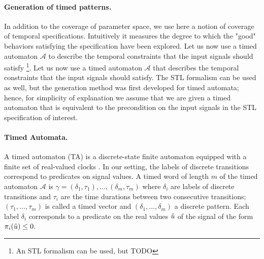 \paragraph{Generation of timed patterns.} 
In addition to the coverage of parameter space, we use here a notion of coverage of temporal specifications. Intuitively it measures the degree to which the "good" behaviors satisfying the specification have been explored. Let us now use a timed automaton $\mathcal{A}$ to describe the temporal constraints that the input signals should satisfy \footnote{An STL formalism can be used, but {\color{red}TODO}}.  Let us now use a timed automaton $\mathcal{A}$ that describes the temporal constraints that the input signals should satisfy. The STL formalism can be used as well, but the generation method  was first developed for timed automata; hence, for simplicity of explanation we assume that we are given a timed automaton that is equivalent to the precondition on the input signals in the STL specification of interest. 

\paragraph{Timed Automata.} 
A timed automaton (TA) is a discrete-state finite automaton equipped with a finite set of real-valued clocks \cite{Alur94}.
In our setting, the labels of discrete transitions correspond to predicates on signal values.
A timed word of length $m$ of the timed automaton $\mathcal{A}$ is $\gamma = (\delta_1, \tau_1), \ldots, (\delta_m, \tau_m)$ where $\delta_i$ are labels of discrete transitions and $\tau_i$ are the time durations between two consecutive transitions; $(\tau_1, \ldots, \tau_m)$ is called a timed vector and $(\delta_1, \ldots, \delta_m)$ a discrete pattern. Each label $\delta_i$ corresponds to a predicate on the real values $\hat{u}$ of the signal of the form $\pi_i(\hat{u}) \le 0$.


